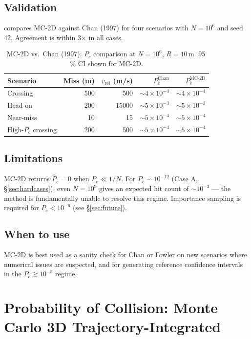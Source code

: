 \documentclass[11pt]{article}
\begin{document}
\subsection{Validation}

 compares MC-2D against Chan (1997) for four scenarios
with $N = 10^6$ and seed 42.  Agreement is within 3$\times$ in all cases.

\begin{table}[htb]
\centering
\caption{MC-2D vs.\ Chan (1997): $P_c$ comparison at $N=10^6$, $R=10$\,m.
         95\,\% CI shown for MC-2D.}
\label{tab:mc2d_validation}
\begin{tabular}{lrrrr}
  \toprule
  Scenario & Miss (m) & $v_\text{rel}$ (m/s) & $P_c^\text{Chan}$ & $P_c^\text{MC-2D}$ \\
  \midrule
  Crossing          & 500  & 500   & $\sim 4\times10^{-4}$ & $\sim 4\times10^{-4}$ \\
  Head-on           & 200  & 15000 & $\sim 5\times10^{-3}$ & $\sim 5\times10^{-3}$ \\
  Near-miss         & 10   & 15    & $\sim 5\times10^{-4}$ & $\sim 5\times10^{-4}$ \\
  High-$P_c$ crossing & 200 & 500  & $\sim 5\times10^{-4}$ & $\sim 5\times10^{-4}$ \\
  \bottomrule
\end{tabular}
\end{table}

\subsection{Limitations}

MC-2D returns $\hat{P}_c = 0$ when $P_c \ll 1/N$.  For $P_c \sim 10^{-12}$
(Case A, \S\ref{sec:hardcases}), even $N = 10^9$ gives an expected hit count
of $\sim10^{-3}$ — the method is fundamentally unable to resolve this regime.
Importance sampling is required for $P_c < 10^{-6}$ (see \S\ref{sec:future}).

\subsection{When to use}
MC-2D is best used as a sanity check for Chan or Fowler on new scenarios where
numerical issues are suspected, and for generating reference confidence intervals
in the $P_c \gtrsim 10^{-5}$ regime.

\section{Probability of Collision: Monte Carlo 3D Trajectory-Integrated}
\label{sec:mc3d}
\end{document}
